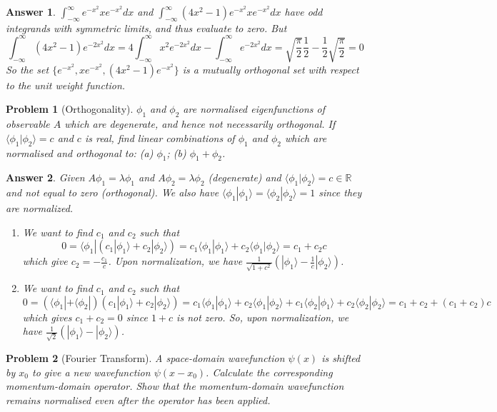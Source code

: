 \documentclass[a4paper]{article}
\newtheorem{ans}{Answer}[section]
\theoremstyle{new}
\newtheorem{qns}{Problem}[section]
\begin{document}
\begin{ans}
$\int_{-\infty}^\infty e^{-x^2}xe^{-x^2}dx$ and $\int_{-\infty}^\infty(4x^2-1)e^{-x^2}xe^{-x^2}dx$ have odd integrands with symmetric limits, and thus evaluate to zero. But
$$\int_{-\infty}^\infty(4x^2-1)e^{-2x^2}dx=4\int_{-\infty}^\infty x^2e^{-2x^2}dx-\int_{-\infty}^\infty e^{-2x^2}dx=\sqrt{\frac{\pi}{2}}\frac{1}{2}-\frac{1}{2}\sqrt{\frac{\pi}{2}}=0$$
So the set $\{e^{-x^2},xe^{-x^2},(4x^2-1)e^{-x^2}\}$ is a mutually orthogonal set with respect to the unit weight function.
\end{ans}
\newpage
\begin{qns}[Orthogonality]
$\phi_1$ and $\phi_2$ are normalised eigenfunctions of observable $A$ which are degenerate, and hence not necessarily orthogonal. If $\langle\phi_1|\phi_2\rangle=c$ and $c$ is real, find linear combinations of $\phi_1$ and $\phi_2$ which are normalised and orthogonal to: (a) $\phi_1$; (b) $\phi_1+\phi_2$.
\end{qns}
\begin{ans}
Given $A\phi_1=\lambda\phi_1$ and $A\phi_2=\lambda\phi_2$ (degenerate) and $\langle\phi_1|\phi_2\rangle=c\in\mathbb{R}$ and not equal to zero (orthogonal). We also have $\langle\phi_1|\phi_1\rangle=\langle\phi_2|\phi_2\rangle=1$ since they are normalized.
\begin{enumerate}[label=(\alph*)]
\item We want to find $c_1$ and $c_2$ such that
$$0=\langle\phi_1|(c_1|\phi_1\rangle+c_2|\phi_2\rangle)=c_1\langle\phi_1|\phi_1\rangle+c_2\langle\phi_1|\phi_2\rangle=c_1+c_2c$$
which give $c_2=-\frac{c_1}{c}$. Upon normalization, we have $\frac{1}{\sqrt{1+c^2}}(|\phi_1\rangle-\frac{1}{c}|\phi_2\rangle)$.
\item We want to find $c_1$ and $c_2$ such that
$$0=(\langle\phi_1|+\langle\phi_2|)(c_1|\phi_1\rangle+c_2|\phi_2\rangle)=c_1\langle\phi_1|\phi_1\rangle+c_2\langle\phi_1|\phi_2\rangle+c_1\langle\phi_2|\phi_1\rangle+c_2\langle\phi_2|\phi_2\rangle=c_1+c_2+(c_1+c_2)c$$
which gives $c_1+c_2=0$ since $1+c$ is not zero. So, upon normalization, we have $\frac{1}{\sqrt{2}}(|\phi_1\rangle-|\phi_2\rangle)$.
\end{enumerate}
\end{ans}
\begin{qns}[Fourier Transform]
A space-domain wavefunction $\psi(x)$ is shifted by $x_0$ to give a new wavefunction $\psi(x-x_0)$. Calculate the corresponding momentum-domain operator. Show that the momentum-domain wavefunction remains normalised even after the operator has been applied.
\end{qns}
\end{document}
